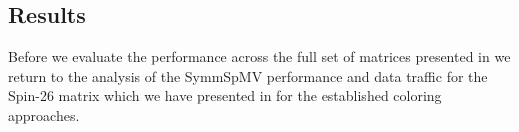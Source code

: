  

\subsection{Results}
Before we evaluate the performance across the full set of matrices presented in  we return to the analysis of the \acrshort{SymmSpMV} performance and data traffic for the Spin-26 matrix  which we have presented in  for the established coloring approaches. 
%
